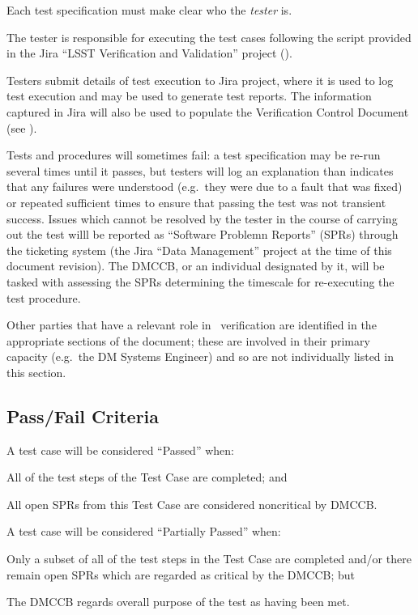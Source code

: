 Each test specification must make clear who the \emph{tester} is.

The tester is responsible for executing the test cases following the script provided in the Jira ``LSST Verification and Validation'' project ().

Testers submit details of test execution to Jira project, where it is used to log test execution and may be used to generate test reports.
The information captured in Jira will also be used to populate the Verification Control Document (see ).

Tests and procedures will sometimes fail: a test specification may be re-run several times until it passes, but testers will log an explanation than indicates that any failures were understood (e.g.\ they were due to a fault that was fixed) or repeated sufficient times to ensure that passing the test was not transient success.
Issues which cannot be resolved by the tester in the course of carrying out the test willl be reported as ``Software Problemn Reports'' (SPRs) through the \product{} ticketing system (the Jira ``Data Management'' project at the time of this document revision).
The DMCCB, or an individual designated by it, will be tasked with assessing the SPRs determining the timescale for re-executing the test procedure.

Other parties that have a relevant role in \product\ verification are identified in the appropriate sections of the document; these are involved in their primary capacity (e.g.\ the DM Systems Engineer) and so are not individually listed in this section.

\subsection{Pass/Fail Criteria}

A test case will be considered ``Passed'' when:

\begin{itemize_single}
\item{All of the test steps of the Test Case are completed; and}
\item{All open SPRs from this Test Case are considered noncritical by DMCCB.}
\end{itemize_single}

A test case will be considered ``Partially Passed'' when:

\begin{itemize_single}
\item{Only a subset of all of the test steps in the Test Case are completed and/or there remain open SPRs which are regarded as critical by the DMCCB; but}
\item{The DMCCB regards overall purpose of the test as having been met.}
\end{itemize_single}

